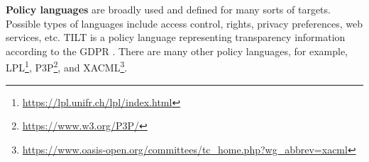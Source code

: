 \textbf{Policy languages} are broadly used and defined for many sorts of targets. Possible types of languages include access control, rights, privacy preferences, web services, etc. TILT is a policy language representing transparency information according to the GDPR \cite{noauthor_review_nodate}.
There are many other policy languages, for example, LPL\footnote{\url{https://lpl.unifr.ch/lpl/index.html}}, P3P\footnote{\url{https://www.w3.org/P3P/}}, and XACML\footnote{\url{https://www.oasis-open.org/committees/tc_home.php?wg_abbrev=xacml}}.